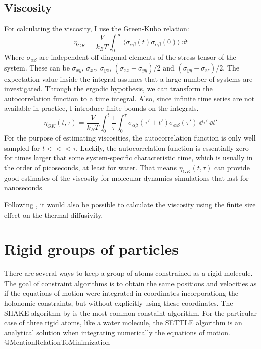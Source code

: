 \subsection{Viscosity}
For calculating the viscosity, I use the Green-Kubo relation:
\begin{equation}
	\eta_{GK} = \frac{V}{k_B T} \int_0^\infty \langle \sigma_{\alpha\beta}(t) \sigma_{\alpha\beta}(0) \rangle\ \dd t
	\label{eq:GK_shear_viscosity}
\end{equation}
Where $\sigma_{\alpha\beta}$ are independent off-diagonal elements of the stress tensor of the system. These can be $\sigma_{xy}$, $\sigma_{xz}$, $\sigma_{yz}$, $(\sigma_{xx}-\sigma_{yy})/2$ and $(\sigma_{yy}-\sigma_{zz})/2$. The expectation value inside the integral assumes that a large number of systems are investigated. Through the ergodic hypothesis, we can transform the autocorrelation function to a time integral. Also, since infinite time series are not available in practice, I introduce finite bounds on the integrals. 
\begin{equation}
	\eta_{GK}(t, \tau) = \frac{V}{k_B T} \int_0^t  \frac{1}{\tau} \int_0^\tau \sigma_{\alpha\beta}(\tau'+t') \sigma_{\alpha\beta}(\tau')\ \dd \tau'\ \dd t' 
\label{eq:GK_shear_viscosity_estimate}
\end{equation}
For the purpose of estimating viscosities, the autocorrelation function is only well sampled for $t <<< \tau$. Luckily, the autocorrelation function is essentially zero for times larger that some system-specific characteristic time, which is usually in the order of picoseconds, at least for water. That means $\eta_{GK}(t, \tau)$ can provide good estimates of the viscosity for molecular dynamics simulations that last for nanoseconds.


Following \cite{Yeh2004}, it would also be possible to calculate the viscosity using the finite size effect on the thermal diffusivity.


\section{Rigid groups of particles}
There are several ways to keep a group of atoms constrained as a rigid molecule. The goal of constraint algorithms is to obtain the same positions and velocities as if the equations of motion were integrated in coordinates incorporationg the holonomic constraints, but without explicitly using these coordinates. The SHAKE algorithm by \citet{Ryckaert1977} is the most common constaint algorithm. For the particular case of three rigid atoms, like a water molecule, the SETTLE algorithm \cite{Miyamoto1992} is an analytical solution when integrating numerically the equations of motion. 
\label{sec:shake}
@MentionRelationToMinimization

